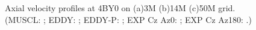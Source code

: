 \begin{figure}[t]
     \caption{Axial velocity profiles at 4BY0 on (a)3M (b)14M (c)50M grid. (MUSCL: \mline; EDDY: \eline; EDDY-P: \epline; EXP Cz Az0: \bluediam; EXP Cz Az180: \reddiam.)}
     \label{w}      
\end{figure}
